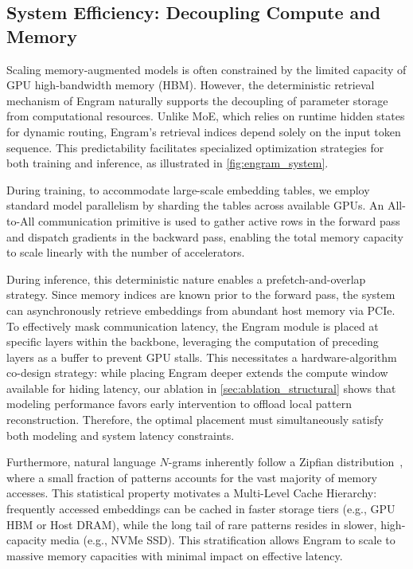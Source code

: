 \subsection{System Efficiency: Decoupling Compute and Memory}
\label{sec:system_efficiency}


Scaling memory-augmented models is often constrained by the limited capacity of GPU high-bandwidth memory (HBM). However, the deterministic retrieval mechanism of Engram naturally supports the decoupling of parameter storage from computational resources. Unlike MoE, which relies on runtime hidden states for dynamic routing, Engram's retrieval indices depend solely on the input token sequence. This predictability facilitates specialized optimization strategies for both training and inference, as illustrated in \autoref{fig:engram_system}.

During training, to accommodate large-scale embedding tables, we employ standard model parallelism by sharding the tables across available GPUs. An All-to-All communication primitive is used to gather active rows in the forward pass and dispatch gradients in the backward pass, enabling the total memory capacity to scale linearly with the number of accelerators.

During inference, this deterministic nature enables a prefetch-and-overlap strategy. Since memory indices are known prior to the forward pass, the system can asynchronously retrieve embeddings from abundant host memory via PCIe. To effectively mask communication latency, the Engram module is placed at specific layers within the backbone, leveraging the computation of preceding layers as a buffer to prevent GPU stalls.
This necessitates a hardware-algorithm co-design strategy: while placing Engram deeper extends the compute window available for hiding latency, our ablation in \autoref{sec:ablation_structural} shows that modeling performance favors early intervention to offload local pattern reconstruction. Therefore, the optimal placement must simultaneously satisfy both modeling and system latency constraints.


Furthermore, natural language $N$-grams inherently follow a Zipfian distribution~\citep{piantadosi2014zipf,Chao1950HumanBA}, where a small fraction of patterns accounts for the vast majority of memory accesses. This statistical property motivates a Multi-Level Cache Hierarchy: frequently accessed embeddings can be cached in faster storage tiers (e.g., GPU HBM or Host DRAM), while the long tail of rare patterns resides in slower, high-capacity media (e.g., NVMe SSD). This stratification allows Engram to scale to massive memory capacities with minimal impact on effective latency.
